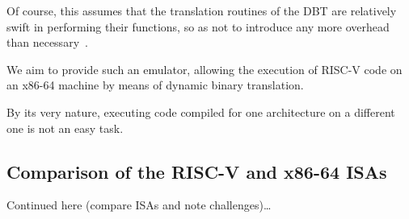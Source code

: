 Of course, this assumes that the translation routines of the DBT are relatively swift in performing their functions, so as not to introduce any more overhead than necessary~\cite[S. 1f.]{bintrans}.

We aim to provide such an emulator, allowing the execution of RISC-V code on an x86-64 machine by means of dynamic binary translation.

By its very nature, executing code compiled for one architecture on a different one is not an easy task.


\subsection{Comparison of the RISC-V and x86-64 ISAs}
\label{sec:isa-cmp}

Continued here (compare ISAs and note challenges)\ldots













